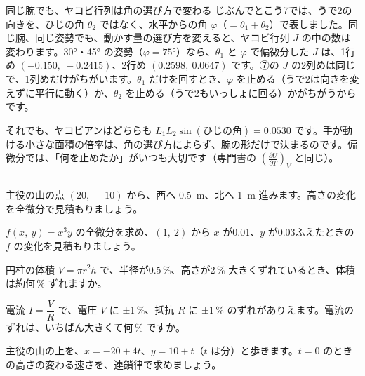 \begin{column}{同じ腕でも、ヤコビ行列は角の選び方で変わる}
じぶんでとこう7では、うで2の向きを、ひじの角 $\theta_2$ ではなく、水平からの角 $\varphi$（$=\theta_1+\theta_2$）で表しました。同じ腕、同じ姿勢でも、動かす量の選び方を変えると、ヤコビ行列 $J$ の中の数は変わります。30°・45° の姿勢（$\varphi=75°$）なら、$\theta_1$ と $\varphi$ で偏微分した $J$ は、1行め $(-0.150,\ -0.2415)$、2行め $(0.2598,\ 0.0647)$ です。⑦の $J$ の2列めは同じで、1列めだけがちがいます。$\theta_1$ だけを回すとき、$\varphi$ を止める（うで2は向きを変えずに平行に動く）か、$\theta_2$ を止める（うで2もいっしょに回る）かがちがうからです。

それでも、ヤコビアンはどちらも $L_1L_2\sin(\text{ひじの角})=0.0530$ です。手が動ける小さな面積の倍率は、角の選び方によらず、腕の形だけで決まるのです。偏微分では、「何を止めたか」がいつも大切です（専門書の $\left(\frac{\partial U}{\partial T}\right)_V$ と同じ）。
\end{column}





\bkendproblems
{}

\bkproblem 主役の山の点 $(20,\ -10)$ から、西へ \qty{0.5}{m}、北へ \qty{1}{m} 進みます。高さの変化を全微分で見積もりましょう。

\bkproblem $f(x,\ y)=x^3y$ の全微分を求め、$(1,\ 2)$ から $x$ が0.01、$y$ が0.03ふえたときの $f$ の変化を見積もりましょう。

\bkproblem 円柱の体積 $V=\pi r^2h$ で、半径が0.5\,\%、高さが2\,\% 大きくずれているとき、体積は約何\,\% ずれますか。

\bkproblem 電流 $I=\dfrac{V}{R}$ で、電圧 $V$ に ±1\,\%、抵抗 $R$ に ±1\,\% のずれがありえます。電流のずれは、いちばん大きくて何\,\% ですか。

\bkproblem 主役の山の上を、$x=-20+4t$、$y=10+t$（$t$ は分）と歩きます。$t=0$ のときの高さの変わる速さを、連鎖律で求めましょう。

